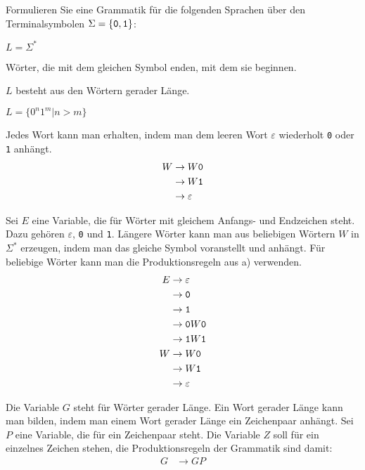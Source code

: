 Formulieren Sie eine Grammatik für die folgenden Sprachen über
den Terminalsymbolen $\Sigma=\{{\tt 0},{\tt 1}\}$:
\begin{teilaufgaben}
\item $L=\Sigma^*$
\item Wörter, die mit dem gleichen Symbol enden, mit dem sie beginnen.
\item $L$ besteht aus den Wörtern gerader Länge.
\item $L=\{0^n1^m|n>m\}$
\end{teilaufgaben}


\begin{loesung}
\begin{teilaufgaben}
\item
Jedes Wort kann man erhalten, indem man dem leeren Wort $\varepsilon$
wiederholt {\tt 0} oder {\tt 1} anhängt.
\begin{align*}
W&\rightarrow W{\tt 0}\\
 &\rightarrow W{\tt 1}\\
 &\rightarrow\varepsilon
\end{align*}
\item Sei $E$ eine Variable, die für Wörter mit gleichem Anfangs-
und Endzeichen steht. Dazu gehören $\varepsilon$, {\tt 0} und {\tt 1}.
Längere
Wörter kann man aus beliebigen Wörtern $W$ in $\Sigma^*$ erzeugen,
indem man das gleiche Symbol voranstellt und anhängt. Für beliebige
Wörter kann
man die Produktionsregeln aus a) verwenden.
\begin{align*}
E&\rightarrow \varepsilon\\
 &\rightarrow {\tt 0}\\
 &\rightarrow {\tt 1}\\
 &\rightarrow {\tt 0}W{\tt 0}\\
 &\rightarrow {\tt 1}W{\tt 1}\\
W&\rightarrow W{\tt 0}\\
 &\rightarrow W{\tt 1}\\
 &\rightarrow\varepsilon
\end{align*}
\item Die Variable $G$ steht für Wörter gerader Länge. Ein Wort
gerader Länge kann man bilden, indem man einem Wort gerader Länge
ein Zeichenpaar anhängt. Sei $P$ eine Variable, die für ein Zeichenpaar
steht. Die Variable $Z$ soll für ein einzelnes Zeichen stehen, die
Produktionsregeln der Grammatik sind damit:
\begin{align*}
G&\rightarrow GP\\

\end{align*}
\end{teilaufgaben}
\end{loesung}
